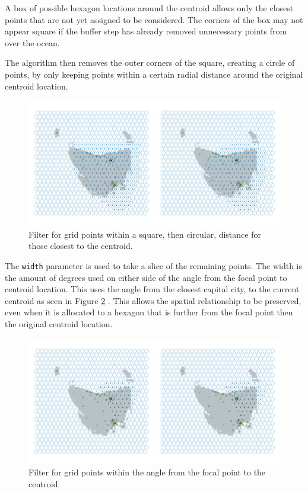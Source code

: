 \documentclass{monashthesis}
\begin{document}
A box of possible hexagon locations around the centroid allows only the closest points that are not yet assigned to be considered. The corners of the box may not appear square if the buffer step has already removed unnecessary points from over the ocean.

The algorithm then removes the outer corners of the square, creating a circle of points, by only keeping points within a certain radial distance around the original centroid location.

\begin{figure}[H]
\centering
\includegraphics[width=16cm]{figures/03-algorithm/4grid.png}
\caption{\label{fig:buffers}Filter for grid points within a square, then circular, distance for those closest to the centroid.}
\end{figure}

The \texttt{width} parameter is used to take a slice of the remaining points. The width is the amount of degrees used on either side of the angle from the focal point to centroid location. This uses the angle from the closest capital city, to the current centroid as seen in Figure \ref{fig:angles} . This allows the spatial relationship to be preserved, even when it is allocated to a hexagon that is further from the focal point then the original centroid location.

\begin{figure}[H]
\centering
\includegraphics[width=16cm]{figures/03-algorithm/5allocate.png}
\caption{\label{fig:angles}Filter for grid points within the angle from the focal point to the centroid.}
\end{figure}
\end{document}
